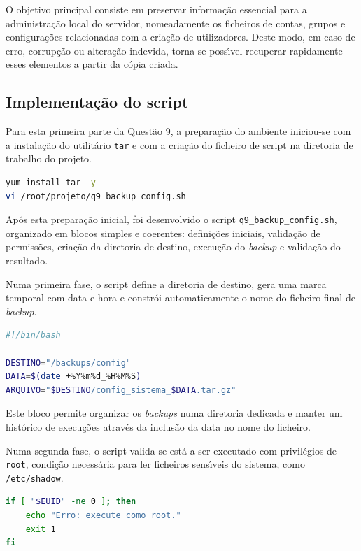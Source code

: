 O objetivo principal consiste em preservar informa\c{c}\~ao essencial para a administra\c{c}\~ao local do servidor, nomeadamente os ficheiros de contas, grupos e configura\c{c}\~oes relacionadas com a cria\c{c}\~ao de utilizadores. Deste modo, em caso de erro, corrup\c{c}\~ao ou altera\c{c}\~ao indevida, torna-se poss\'{\i}vel recuperar rapidamente esses elementos a partir da c\'opia criada.

\subsection{Implementa\c{c}\~ao do script}

Para esta primeira parte da Quest\~ao 9, a prepara\c{c}\~ao do ambiente iniciou-se com a instala\c{c}\~ao do utilit\'ario \texttt{tar} e com a cria\c{c}\~ao do ficheiro de script na diretoria de trabalho do projeto.

\begin{lstlisting}[language=bash,caption={Preparacao inicial da Questao 9}]
yum install tar -y
vi /root/projeto/q9_backup_config.sh
\end{lstlisting}

Ap\'os esta prepara\c{c}\~ao inicial, foi desenvolvido o script \texttt{q9\_backup\_config.sh}, organizado em blocos simples e coerentes: defini\c{c}\~oes iniciais, valida\c{c}\~ao de permiss\~oes, cria\c{c}\~ao da diretoria de destino, execu\c{c}\~ao do \textit{backup} e valida\c{c}\~ao do resultado.

Numa primeira fase, o script define a diretoria de destino, gera uma marca temporal com data e hora e constr\'oi automaticamente o nome do ficheiro final de \textit{backup}.

\begin{lstlisting}[language=bash,caption={Definicoes iniciais do script}]
#!/bin/bash

DESTINO="/backups/config"
DATA=$(date +%Y%m%d_%H%M%S)
ARQUIVO="$DESTINO/config_sistema_$DATA.tar.gz"
\end{lstlisting}

Este bloco permite organizar os \textit{backups} numa diretoria dedicada e manter um hist\'orico de execu\c{c}\~oes atrav\'es da inclus\~ao da data no nome do ficheiro.

Numa segunda fase, o script valida se est\'a a ser executado com privil\'egios de \texttt{root}, condi\c{c}\~ao necess\'aria para ler ficheiros sens\'{\i}veis do sistema, como \texttt{/etc/shadow}.

\begin{lstlisting}[language=bash,caption={Validacao de privilegios de execucao}]
if [ "$EUID" -ne 0 ]; then
    echo "Erro: execute como root."
    exit 1
fi
\end{lstlisting}

